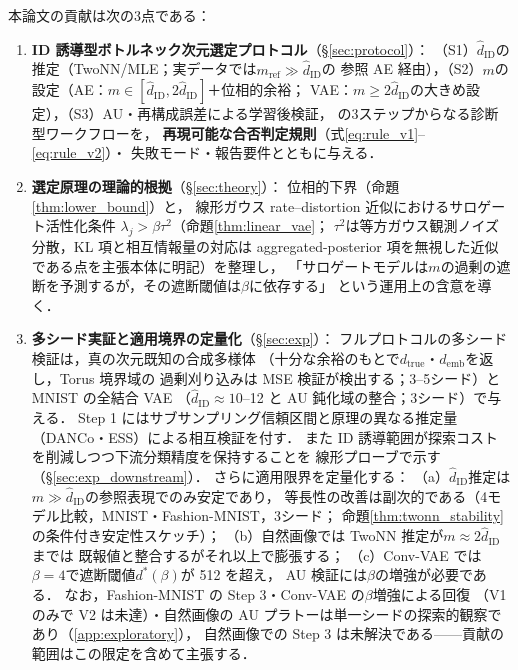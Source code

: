 \documentclass[11pt,a4paper]{jsarticle}
\newcommand{\hatdID}{\hat{d}_{\mathrm{ID}}}
\newcommand{\dtrue}{d_{\mathrm{true}}}
\newcommand{\demb}{d_{\mathrm{emb}}}
\newcommand{\dstar}{d^{*}(\beta)}
\begin{document}
本論文の貢献は次の3点である：
\begin{enumerate}
  \item \textbf{ID 誘導型ボトルネック次元選定プロトコル}（§\ref{sec:protocol}）：
        （S1）$\hatdID$の推定（TwoNN/MLE；実データでは$m_{\mathrm{ref}} \gg \hatdID$の
        参照 AE 経由），（S2）$m$の設定（AE：$m \in [\hatdID, 2\hatdID]$＋位相的余裕；
        VAE：$m \geq 2\hatdID$の大きめ設定），（S3）AU・再構成誤差による学習後検証，
        の3ステップからなる診断型ワークフローを，
        \textbf{再現可能な合否判定規則}（式\eqref{eq:rule_v1}--\eqref{eq:rule_v2}）・
        失敗モード・報告要件とともに与える．
  \item \textbf{選定原理の理論的根拠}（§\ref{sec:theory}）：
        位相的下界（命題\ref{thm:lower_bound}）と，
        線形ガウス rate--distortion 近似におけるサロゲート活性化条件
        $\lambda_j > \beta\tau^2$（命題\ref{thm:linear_vae}；
        $\tau^2$は等方ガウス観測ノイズ分散，KL 項と相互情報量の対応は
        aggregated-posterior 項を無視した近似である点を主張本体に明記）を整理し，
        「サロゲートモデルは$m$の過剰の遮断を予測するが，その遮断閾値は$\beta$に依存する」
        という運用上の含意を導く．
  \item \textbf{多シード実証と適用境界の定量化}（§\ref{sec:exp}）：
        フルプロトコルの多シード検証は，真の次元既知の合成多様体
        （十分な余裕のもとで$\dtrue$・$\demb$を返し，Torus 境界域の
        過剰刈り込みは MSE 検証が検出する；3--5シード）と MNIST の全結合 VAE
        （$\hatdID \approx 10$--12 と AU 鈍化域の整合；3シード）で与える．
        Step 1 にはサブサンプリング信頼区間と原理の異なる推定量
        （DANCo・ESS）による相互検証を付す．
        また ID 誘導範囲が探索コストを削減しつつ下流分類精度を保持することを
        線形プローブで示す（§\ref{sec:exp_downstream}）．
        さらに適用限界を定量化する：
        （a）$\hatdID$推定は$m \gg \hatdID$の参照表現でのみ安定であり，
        等長性の改善は副次的である（4モデル比較，MNIST・Fashion-MNIST，3シード；
        命題\ref{thm:twonn_stability}の条件付き安定性スケッチ）；
        （b）自然画像では TwoNN 推定が$m \approx 2\hatdID$までは
        既報値\cite{pope2021intrinsic}と整合するがそれ以上で膨張する；
        （c）Conv-VAE では$\beta = 4$で遮断閾値$\dstar$が 512 を超え，
        AU 検証には$\beta$の増強が必要である．
        なお，Fashion-MNIST の Step 3・Conv-VAE の$\beta$増強による回復
        （V1 のみで V2 は未達）・自然画像の
        AU プラトーは単一シードの探索的観察であり（\ref{app:exploratory}），
        自然画像での Step 3 は未解決である——貢献の範囲はこの限定を含めて主張する．
\end{enumerate}
\end{document}
